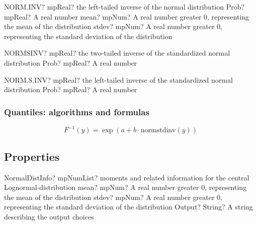 \vspace{0.6cm}
\begin{mpFunctionsExtract}
	\mpWorksheetFunctionThreeNotImplemented
	{NORM.INV? mpReal? the left-tailed inverse of the normal distribution}
	{Prob? mpReal? A real number}
	{mean? mpNum? A real number greater 0, representing the mean of the distribution}
	{stdev? mpNum? A real number greater 0, representing the standard deviation of the distribution}
\end{mpFunctionsExtract}


\vspace{0.6cm}
\begin{mpFunctionsExtract}
	\mpWorksheetFunctionOneNotImplemented
	{NORMSINV? mpReal? the two-tailed inverse of the standardized normal distribution}
	{Prob? mpReal? A real number}
\end{mpFunctionsExtract}

\vspace{0.6cm}
\begin{mpFunctionsExtract}
	\mpWorksheetFunctionOneNotImplemented
	{NORM.S.INV? mpReal? the left-tailed inverse of the standardized normal distribution}
	{Prob? mpReal? A real number}
\end{mpFunctionsExtract}


\subsubsection{Quantiles: algorithms and formulas}

\begin{equation} 
	F^{-1}(y)= \exp(a+b \cdot \text{normstdinv}(y))
\end{equation}




\subsection{Properties}
\label{NormalDistributionProperties}


\begin{mpFunctionsExtract}
	\mpFunctionThreeNotImplemented
	{NormalDistInfo? mpNumList? moments and related information for the central Lognormal-distribution}
	{mean? mpNum? A real number greater 0, representing the mean of the distribution}
	{stdev? mpNum? A real number greater 0, representing the standard deviation of the distribution}
	{Output? String? A string describing the output choices}
\end{mpFunctionsExtract}

